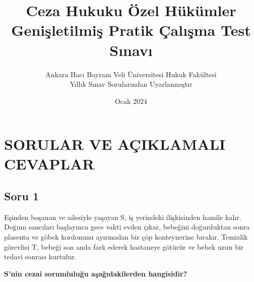 \documentclass[a4paper, 11pt, twocolumn]{article}
\title{
    \Huge \textbf{Ceza Hukuku Özel Hükümler} \\
    \large \textbf{Genişletilmiş Pratik Çalışma Test Sınavı}
}
\author{Ankara Hacı Bayram Veli Üniversitesi Hukuk Fakültesi \\ Yıllık Sınav Sorularından Uyarlanmıştır}
\date{Ocak 2024}
\begin{document}
\twocolumn[\maketitle]

\section*{SORULAR VE AÇIKLAMALI CEVAPLAR}
\vspace{0.3cm}

\subsection*{Soru 1}
Eşinden boşanan ve ailesiyle yaşayan S, iş yerindeki ilişkisinden hamile kalır. Doğum sancıları başlayınca gece vakti evden çıkar, bebeğini doğurduktan sonra plasenta ve göbek kordonunu ayırmadan bir çöp konteynerine bırakır. Temizlik görevlisi T, bebeği son anda fark ederek hastaneye götürür ve bebek uzun bir tedavi sonrası kurtulur.

\textbf{S'nin cezai sorumluluğu aşağıdakilerden hangisidir?}
\end{document}

